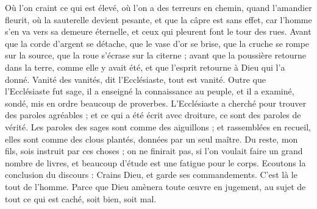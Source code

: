 \begin{multicols}{2}
Où l’on craint ce qui est élevé, où l’on a des terreurs en chemin, quand l'amandier fleurit, où la sauterelle devient pesante, et que la câpre est sans effet, car l'homme s'en va vers sa demeure éternelle, et ceux qui pleurent font le tour des rues.
Avant que la corde d'argent se détache, que le vase d'or se brise, que la cruche se rompe sur la source, que la roue s’écrase sur la citerne ;
avant que la poussière retourne dans la terre, comme elle y avait été, et que l'esprit retourne à Dieu qui l'a donné.
Vanité des vanités, dit l'Ecclésiaste, tout est vanité.
Outre que l'Ecclésiaste fut sage, il a enseigné la connaissance au peuple, et il a examiné, sondé, mis en ordre beaucoup de proverbes.
L'Ecclésiaste a cherché pour trouver des paroles agréables ; et ce qui a été écrit avec droiture, ce sont des paroles de vérité.
Les paroles des sages sont comme des aiguillons ; et rassemblées en recueil, elles sont comme des clous plantés, données par un seul maître.
Du reste, mon fils, sois instruit par ces choses ; on ne finirait pas, si l’on voulait faire un grand nombre de livres, et beaucoup d'étude est une fatigue pour le corps.
Ecoutons la conclusion du discours : Crains Dieu, et garde ses commandements. C'est là le tout de l'homme.
Parce que Dieu amènera toute œuvre en jugement, au sujet de tout ce qui est caché, soit bien, soit mal.
\PPE{}
\end{multicols}

